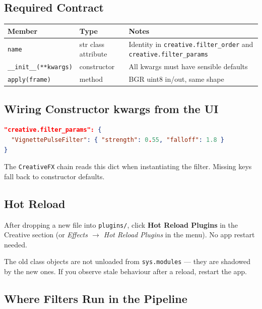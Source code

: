 \documentclass[11pt,a4paper,openany]{report}
\begin{document}
\subsection{Required Contract}

\begin{tabularx}{\linewidth}{@{}llX@{}}
    \toprule
    \textbf{Member} & \textbf{Type} & \textbf{Notes} \\
    \midrule
    \texttt{name}   & str class attribute & Identity in \texttt{creative.filter\_order} and \texttt{creative.filter\_params} \\
    \texttt{\_\_init\_\_(**kwargs)} & constructor & All kwargs must have sensible defaults \\
    \texttt{apply(frame)} & method & BGR uint8 in/out, same shape \\
    \bottomrule
\end{tabularx}

\subsection{Wiring Constructor kwargs from the UI}

\begin{lstlisting}[language=json]
"creative.filter_params": {
  "VignettePulseFilter": { "strength": 0.55, "falloff": 1.8 }
}
\end{lstlisting}

The \texttt{CreativeFX} chain reads this dict when instantiating the
filter. Missing keys fall back to constructor defaults.

\subsection{Hot Reload}

After dropping a new file into \texttt{plugins/}, click \textbf{Hot Reload
Plugins} in the Creative section (or \textit{Effects $\rightarrow$ Hot
Reload Plugins} in the menu). No app restart needed.

\begin{btnote}
The old class objects are not unloaded from \texttt{sys.modules} --- they
are shadowed by the new ones. If you observe stale behaviour after a
reload, restart the app.
\end{btnote}

\subsection{Where Filters Run in the Pipeline}
\end{document}
